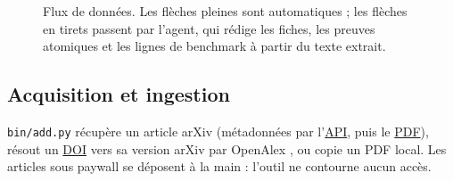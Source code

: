 \documentclass[11pt,a4paper]{article}
\newcommand{\cmd}[1]{\texttt{#1}}
\newcommand{\gl}[2]{\hyperlink{gl:#1}{\textcolor{glcolor}{#2}}}
\begin{document}
\begin{figure}[ht]
\caption{Flux de données. Les flèches pleines sont automatiques ; les flèches en tirets
passent par l'agent, qui rédige les fiches, les preuves atomiques et les lignes de benchmark
à partir du texte extrait.}
\label{fig:pipeline}
\end{figure}

\subsection{Acquisition et ingestion}

\cmd{bin/add.py} récupère un article arXiv (métadonnées par l'\gl{API}{API}, puis le \gl{PDF}{PDF}), résout un
\gl{DOI}{DOI} vers sa version arXiv par OpenAlex \citep{priem2022openalex}, ou copie un PDF local. Les
articles sous paywall se déposent à la main : l'outil ne contourne aucun accès.
\end{document}
